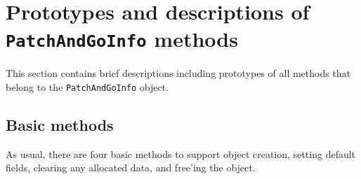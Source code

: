 \par
\section{Prototypes and descriptions of {\tt PatchAndGoInfo} methods}
\label{section:PatchAndGoInfo:proto}
\par
This section contains brief descriptions including prototypes
of all methods that belong to the {\tt PatchAndGoInfo} object.
\par
\subsection{Basic methods}
\label{subsection:PatchAndGoInfo:proto:basics}
\par
As usual, there are four basic methods to support object creation,
setting default fields, clearing any allocated data, and free'ing
the object.
\par
